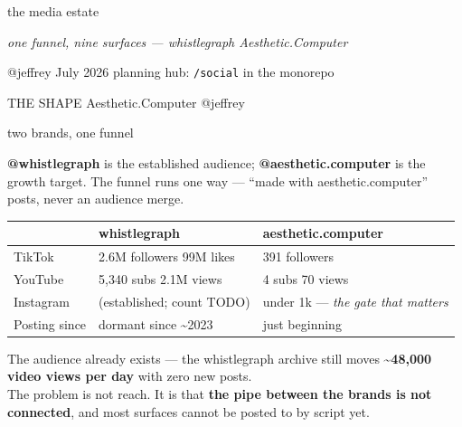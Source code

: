 \documentclass[12pt]{article}
\makeatletter
\newcommand{\rb}{{\color{acred}\textbullet}\hspace{0.6em}}
\newcommand{\ac}{Aesthetic\textcolor{acpink}{.}Computer}
\newenvironment{slide}[2]{%
  \clearpage
  {\footnotesize\color{acgray}\MakeUppercase{#1}\hfill}%
  {\footnotesize\color{acgray}\ac{} \textperiodcentered{} @jeffrey}\par
  \vspace{0.1em}
  {\acbold\fontsize{31pt}{35pt}\selectfont\color{acdark}#2\par}
  \vspace{0.9em}
  \large
}{%
  \vfill
  {\hfill\footnotesize\color{acgray}\thepage}%
}
\makeatother
\begin{document}
\vspace*{\fill}
\begin{center}
  {\acbold\fontsize{58pt}{62pt}\selectfont\color{acdark}the media estate\par}
  \vspace{1.2em}
  {\fontsize{19pt}{24pt}\selectfont\itshape\color{acpink}
    one funnel, nine surfaces --- whistlegraph \textrightarrow{} \ac\par}
  \vspace{2.2em}
  {\large\color{acgray} @jeffrey \textperiodcentered{} July 2026 \textperiodcentered{} planning hub: \texttt{/social} in the monorepo\par}
\end{center}
\vspace*{\fill}
{\hfill\footnotesize\color{acgray}\thepage}

\begin{slide}{the shape}{two brands, one funnel}
\textbf{@whistlegraph} is the established audience; \textbf{@aesthetic.computer} is the growth target.
The funnel runs one way --- ``made with aesthetic.computer'' posts, never an audience merge.

\vspace{1.2em}
\begin{center}
\begin{tabular}{@{}lll@{}}
\toprule
 & \textbf{whistlegraph} & \textbf{aesthetic.computer} \\
\midrule
TikTok & 2.6M followers \textperiodcentered{} 99M likes & 391 followers \\
YouTube & 5{,}340 subs \textperiodcentered{} 2.1M views & 4 subs \textperiodcentered{} 70 views \\
Instagram & (established; count TODO) & under 1k --- \textit{the gate that matters} \\
Posting since & dormant since \textasciitilde 2023 & just beginning \\
\bottomrule
\end{tabular}
\end{center}

\vspace{1.2em}
\rb The audience already exists --- the whistlegraph archive still moves \textbf{\textasciitilde 48{,}000 video views per day} with zero new posts.\\
\rb The problem is not reach. It is that \textbf{the pipe between the brands is not connected}, and most surfaces cannot be posted to by script yet.
\end{slide}
\end{document}
